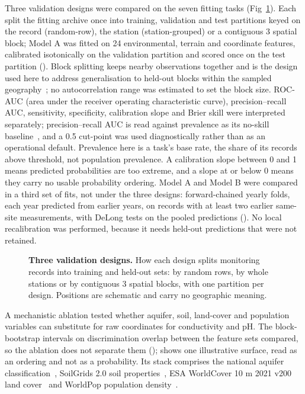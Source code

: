 \documentclass[10pt,letterpaper]{article}
\begin{document}
Three validation designs were compared on the seven fitting tasks (Fig~\ref{fig:validation-designs}). Each split the fitting archive once into training, validation and test partitions keyed on the record (random-row), the station (station-grouped) or a contiguous 3\textdegree{} spatial block; Model A was fitted on 24 environmental, terrain and coordinate features, calibrated isotonically on the validation partition and scored once on the test partition (). Block splitting keeps nearby observations together and is the design used here to address generalisation to held-out blocks within the sampled geography~\cite{Meyer2019}; no autocorrelation range was estimated to set the block size. ROC-AUC (area under the receiver operating characteristic curve), precision--recall AUC, sensitivity, specificity, calibration slope and Brier skill were interpreted separately; precision--recall AUC is read against prevalence as its no-skill baseline~\cite{Saito2015}, and a 0.5 cut-point was used diagnostically rather than as an operational default. Prevalence here is a task's base rate, the share of its records above threshold, not population prevalence. A calibration slope between 0 and 1 means predicted probabilities are too extreme, and a slope at or below 0 means they carry no usable probability ordering. Model A and Model B were compared in a third set of fits, not under the three designs: forward-chained yearly folds, each year predicted from earlier years, on records with at least two earlier same-site measurements, with DeLong tests on the pooled predictions (). No local recalibration was performed, because it needs held-out predictions that were not retained.\label{callout:fig:validation-designs}

\begin{figure}[!ht]
\caption{\textbf{Three validation designs.} How each design splits monitoring records into training and held-out sets: by random rows, by whole stations or by contiguous 3\textdegree{} spatial blocks, with one partition per design. Positions are schematic and carry no geographic meaning.}
\label{fig:validation-designs}
\end{figure}

A mechanistic ablation tested whether aquifer, soil, land-cover and population variables can substitute for raw coordinates for conductivity and pH. The block-bootstrap intervals on discrimination overlap between the feature sets compared, so the ablation does not separate them ();  shows one illustrative surface, read as an ordering and not as a probability. Its stack comprises the national aquifer classification~\cite{CGWB-ManualAquiferMapping}, SoilGrids 2.0 soil properties~\cite{Poggio2021}, ESA WorldCover 10 m 2021 v200 land cover~\cite{Zanaga2022} and WorldPop population density~\cite{WorldPop2020}.
\end{document}
